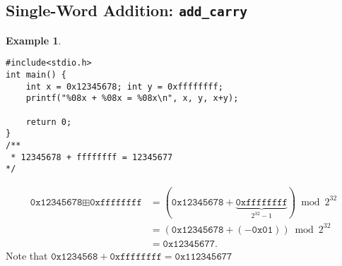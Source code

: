 \documentclass[12pt,openany]{book}
\theoremstyle{definition}
\newtheorem{example}{Example}[chapter]
\begin{document}
	\subsection{Single-Word Addition: \texttt{add\_carry}}
	\begin{example}
		\ \begin{lstlisting}[style=C, caption={},captionpos=t]
#include<stdio.h>
int main() {
	int x = 0x12345678; int y = 0xffffffff;
	printf("%08x + %08x = %08x\n", x, y, x+y);
	
	return 0;
}
/**
 * 12345678 + ffffffff = 12345677
*/
		\end{lstlisting}
		\begin{align*}
			\texttt{0x12345678}\boxplus\texttt{0xffffffff} &= (\texttt{0x12345678} + \underbrace{\texttt{0xffffffff}}_{2^{32}-1}) \bmod 2^{32}\\
			&=(\texttt{0x12345678} + (-\texttt{0x01})) \bmod 2^{32}\\
			&=\texttt{0x12345677}.
		\end{align*} Note that \(\texttt{0x1234568}+\texttt{0xffffffff}=\texttt{0x112345677}\)
	\end{example}
\end{document}
